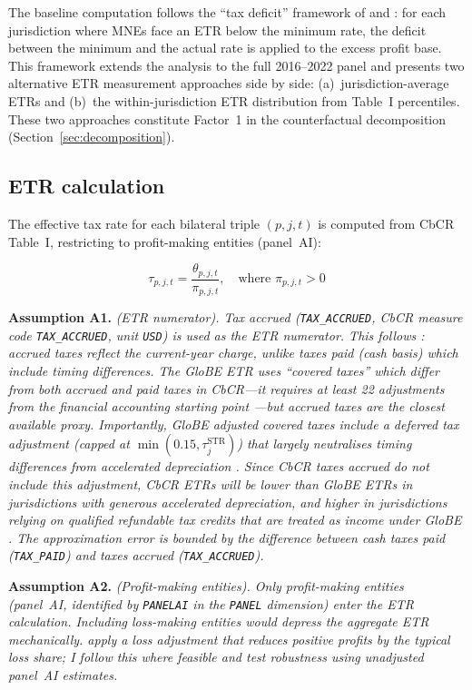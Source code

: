 \documentclass[11pt,a4paper]{article}
\newcommand{\code}[1]{\texttt{#1}}
\newcommand{\assumption}[2]{\noindent\textbf{Assumption #1.} \textit{#2}\medskip}
\begin{document}
The baseline computation follows the ``tax deficit'' framework of \citet{clausing2021} and \citet{barake2022}: for each jurisdiction where MNEs face an ETR below the minimum rate, the deficit between the minimum and the actual rate is applied to the excess profit base. This framework extends the analysis to the full 2016--2022 panel and presents two alternative ETR measurement approaches side by side: (a)~jurisdiction-average ETRs and (b)~the within-jurisdiction ETR distribution from Table~I percentiles. These two approaches constitute Factor~1 in the counterfactual decomposition (Section~\ref{sec:decomposition}).

\subsection{ETR calculation}\label{sec:etr}

The effective tax rate for each bilateral triple $(p, j, t)$ is computed from CbCR Table~I, restricting to profit-making entities (panel~AI):

\begin{equation}\label{eq:etr}
\tau_{p,j,t} = \frac{\theta_{p,j,t}}{\pi_{p,j,t}}, \quad \text{where } \pi_{p,j,t} > 0
\end{equation}

\assumption{A1}{(ETR numerator). Tax accrued (\code{TAX\_ACCRUED}, CbCR measure code \code{TAX\_ACCRUED}, unit \code{USD}) is used as the ETR numerator. This follows \citet{hugger2025}: accrued taxes reflect the current-year charge, unlike taxes paid (cash basis) which include timing differences. The GloBE ETR uses ``covered taxes'' which differ from both accrued and paid taxes in CbCR---it requires at least 22 adjustments from the financial accounting starting point \citep{hanlon2023}---but accrued taxes are the closest available proxy. Importantly, GloBE adjusted covered taxes include a deferred tax adjustment (capped at $\min(0.15, \tau^{\text{STR}}_j)$) that largely neutralises timing differences from accelerated depreciation \citep{hanlon2023}. Since CbCR taxes accrued do not include this adjustment, CbCR ETRs will be \emph{lower} than GloBE ETRs in jurisdictions with generous accelerated depreciation, and \emph{higher} in jurisdictions relying on qualified refundable tax credits that are treated as income under GloBE \citep{liotti2022}. The approximation error is bounded by the difference between cash taxes paid (\code{TAX\_PAID}) and taxes accrued (\code{TAX\_ACCRUED}).}

\assumption{A2}{(Profit-making entities). Only profit-making entities (panel~AI, identified by \code{PANELAI} in the \code{PANEL} dimension) enter the ETR calculation. Including loss-making entities would depress the aggregate ETR mechanically. \citet{hugger2025} apply a loss adjustment that reduces positive profits by the typical loss share; I follow this where feasible and test robustness using unadjusted panel~AI estimates.}
\end{document}

